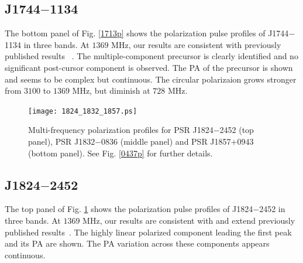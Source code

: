 \documentclass[useAMS,usenatbib]{mn2e}
\begin{document}
\subsection{J1744$-$1134}

The bottom panel of Fig. \ref{1713p} shows the polarization pulse profiles of J1744$-$1134 
in three bands.
%
At $1369$ MHz, our results are consistent with previously published results
~\citep{Yan11}.
%
The multiple-component precursor is clearly identified and no significant 
post-cursor component is observed.
%
The PA of the precursor is shown and seems to be complex but continuous.
%
The circular polarizaion grows stronger from $3100$ to $1369$ MHz, but diminish 
at $728$ MHz.



\begin{figure}
\begin{center}
\texttt{[image: 1824\_1832\_1857.ps]}
\caption{Multi-frequency polarization profiles for PSR J1824$-$2452 (top 
panel), PSR J1832$-$0836 (middle panel) and PSR J1857$+$0943 (bottom panel). 
See Fig. \ref{0437p} for further details.}
\label{1824p}
\end{center}
\end{figure}

\subsection{J1824$-$2452}

The top panel of Fig. \ref{1824p} shows the polarization pulse profiles of 
J1824$-$2452 
in three bands.
%
At $1369$ MHz, our results are consistent with and extend previously published 
results~\citep{Yan11}.
%
The highly linear polarized component leading the first peak and its PA 
are shown.
%
The PA variation across these components appears continuous.
%

\end{document}
